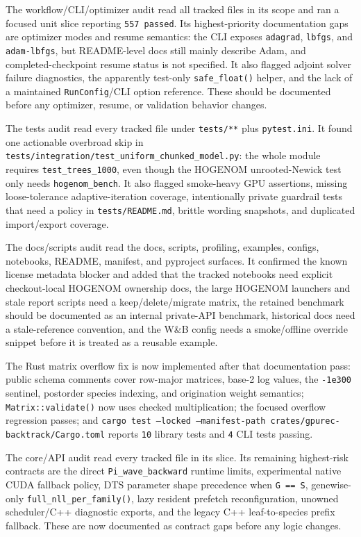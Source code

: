 \documentclass[11pt]{article}
\begin{document}
The workflow/CLI/optimizer audit read all tracked files in its scope and ran a
focused unit slice reporting \texttt{557 passed}.  Its highest-priority
documentation gaps are optimizer modes and resume semantics: the CLI exposes
\texttt{adagrad}, \texttt{lbfgs}, and \texttt{adam-lbfgs}, but README-level docs
still mainly describe Adam, and completed-checkpoint resume status is not
specified.  It also flagged adjoint solver failure diagnostics, the apparently
test-only \texttt{safe\_float()} helper, and the lack of a maintained
\texttt{RunConfig}/CLI option reference.  These should be documented before any
optimizer, resume, or validation behavior changes.

The tests audit read every tracked file under \texttt{tests/**} plus
\texttt{pytest.ini}.  It found one actionable overbroad skip in
\texttt{tests/integration/test\_uniform\_chunked\_model.py}: the whole module
requires \texttt{test\_trees\_1000}, even though the HOGENOM unrooted-Newick
test only needs \texttt{hogenom\_bench}.  It also flagged smoke-heavy GPU
assertions, missing loose-tolerance adaptive-iteration coverage, intentionally
private guardrail tests that need a policy in \texttt{tests/README.md}, brittle
wording snapshots, and duplicated import/export coverage.

The docs/scripts audit read the docs, scripts, profiling, examples, configs,
notebooks, README, manifest, and pyproject surfaces.  It confirmed the known
license metadata blocker and added that the tracked notebooks need explicit
checkout-local HOGENOM ownership docs, the large HOGENOM launchers and stale
report scripts need a keep/delete/migrate matrix, the retained benchmark should
be documented as an internal private-API benchmark, historical docs need a
stale-reference convention, and the W\&B config needs a smoke/offline override
snippet before it is treated as a reusable example.

The Rust matrix overflow fix is now implemented after that documentation pass:
public schema comments cover row-major matrices, base-2 log values, the
\texttt{-1e300} sentinel, postorder species indexing, and origination weight
semantics; \texttt{Matrix::validate()} now uses checked multiplication; the
focused overflow regression passes; and
\texttt{cargo test --locked --manifest-path crates/gpurec-backtrack/Cargo.toml}
reports \texttt{10} library tests and \texttt{4} CLI tests passing.

The core/API audit read every tracked file in its slice.  Its remaining
highest-risk contracts are the direct \texttt{Pi\_wave\_backward} runtime limits,
experimental native CUDA fallback policy, DTS parameter shape precedence when
\texttt{G == S}, genewise-only \texttt{full\_nll\_per\_family()}, lazy resident
prefetch reconfiguration, unowned scheduler/C++ diagnostic exports, and the
legacy C++ leaf-to-species prefix fallback.  These are now documented as
contract gaps before any logic changes.
\end{document}
